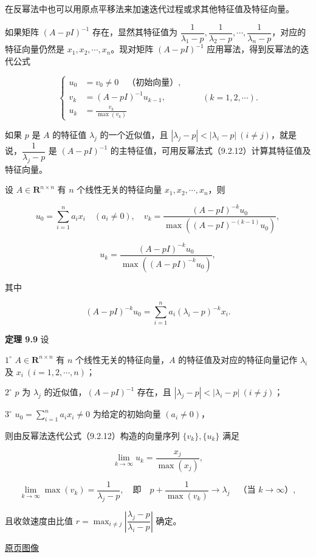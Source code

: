 \documentclass[
  10pt,
  fontset=fandol]{ctexart}
\begin{document}
在反幂法中也可以用原点平移法来加速迭代过程或求其他特征值及特征向量。

如果矩阵 \((A-pI)^{-1}\) 存在，显然其特征值为 \(\dfrac1{\lambda_1-p},\dfrac1{\lambda_2-p},\cdots,\dfrac1{\lambda_n-p}\)，对应的特征向量仍然是 \(x_1,x_2,\cdots,x_n\)。现对矩阵 \((A-pI)^{-1}\) 应用幂法，得到反幂法的迭代公式

\[
\left\{
\begin{aligned}
u_0&=v_0\ne0\quad\text{（初始向量）},\\
v_k&=(A-pI)^{-1}u_{k-1},\\
u_k&=\frac{v_k}{\max(v_k)}
\end{aligned}
\right.\qquad(k=1,2,\cdots).
\tag{9.2.12}
\]

如果 \(p\) 是 \(A\) 的特征值 \(\lambda_j\) 的一个近似值，且 \(|\lambda_j-p|<|\lambda_i-p|\ (i\ne j)\)，就是说，\(\dfrac1{\lambda_j-p}\) 是 \((A-pI)^{-1}\) 的主特征值，可用反幂法式（9.2.12）计算其特征值及特征向量。

设 \(A\in\mathbf R^{n\times n}\) 有 \(n\) 个线性无关的特征向量 \(x_1,x_2,\cdots,x_n\)，则

\[
u_0=\sum_{i=1}^na_ix_i\quad(a_i\ne0),\quad
v_k=\frac{(A-pI)^{-k}u_0}{\max((A-pI)^{-(k-1)}u_0)},
\]

\[
u_k=\frac{(A-pI)^{-k}u_0}{\max((A-pI)^{-k}u_0)},
\]

其中

\[
(A-pI)^{-k}u_0=\sum_{i=1}^na_i(\lambda_i-p)^{-k}x_i.
\]

\textbf{定理 9.9} 设

\(1^\circ\) \(A\in\mathbf R^{n\times n}\) 有 \(n\) 个线性无关的特征向量，\(A\) 的特征值及对应的特征向量记作 \(\lambda_i\) 及 \(x_i\ (i=1,2,\cdots,n)\)；

\(2^\circ\) \(p\) 为 \(\lambda_j\) 的近似值，\((A-pI)^{-1}\) 存在，且 \(|\lambda_j-p|<|\lambda_i-p|\ (i\ne j)\)；

\(3^\circ\) \(u_0=\displaystyle\sum_{i=1}^na_ix_i\ne0\) 为给定的初始向量 \((a_i\ne0)\)，

则由反幂法迭代公式（9.2.12）构造的向量序列 \(\{v_k\},\{u_k\}\) 满足

\[
\lim_{k\to\infty}u_k=\frac{x_j}{\max(x_j)},
\]

\[
\lim_{k\to\infty}\max(v_k)=\frac1{\lambda_j-p},\quad\text{即}\quad p+\frac1{\max(v_k)}\to\lambda_j\quad\text{（当 }k\to\infty\text{）},
\]

且收敛速度由比值 \(r=\displaystyle\max_{i\ne j}\left|\dfrac{\lambda_j-p}{\lambda_i-p}\right|\) 确定。

\href{../../source-images/pdf-242.jpeg}{原页图像}
\end{document}
